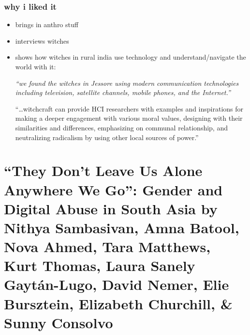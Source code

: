 \documentclass[aspectratio=169,10pt]{beamer} %
\begin{document}
\begin{frame}\frametitle{why i liked it}
    \begin{itemize}
      \item brings in anthro stuff
      \item interviews witches
      \item shows how witches in rural india use technology and understand/navigate the world with it:

      {\itshape
      \vspace{1em}
       ``we found the witches in Jessore using modern communication technologies including television, satellite channels, mobile phones, and the Internet.''
      
      \vspace{1em}
      
      ``\dots witchcraft can provide HCI researchers with examples and inspirations for making a deeper engagement with various moral values, designing with their similarities and differences, emphasizing on communal relationship, and neutralizing radicalism by using other local sources of power.''
      }
    \end{itemize}
\end{frame}


\section[``They Don’t Leave Us Alone Anywhere We Go'': Gender and Digital Abuse in South Asia]{``They Don’t Leave Us Alone Anywhere We Go'': Gender and Digital Abuse in South Asia {\scriptsize \color{Black} by \textbf{Nithya Sambasivan}, \textbf{Amna Batool}, \textbf{Nova Ahmed}, \textbf{Tara Matthews}, \textbf{Kurt Thomas}, \textbf{Laura Sanely Gaytán-Lugo}, \textbf{David Nemer}, \textbf{Elie Bursztein}, \textbf{Elizabeth Churchill}, \& \textbf{Sunny Consolvo}}}
\end{document}
